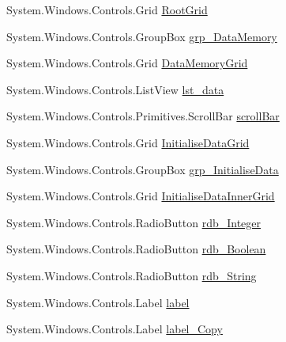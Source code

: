 \begin{DoxyCompactItemize}
\item 
System.\+Windows.\+Controls.\+Grid \hyperlink{class_c_p_u___o_s___simulator_1_1_memory_window_ae2c7b1b6f5c337af62d18b0e2a4d098c}{Root\+Grid}
\item 
System.\+Windows.\+Controls.\+Group\+Box \hyperlink{class_c_p_u___o_s___simulator_1_1_memory_window_a283493c20704b70efe355621cd6e5aa4}{grp\+\_\+\+Data\+Memory}
\item 
System.\+Windows.\+Controls.\+Grid \hyperlink{class_c_p_u___o_s___simulator_1_1_memory_window_a93e699c04992f66b92f0d3b834f267d1}{Data\+Memory\+Grid}
\item 
System.\+Windows.\+Controls.\+List\+View \hyperlink{class_c_p_u___o_s___simulator_1_1_memory_window_a00f6d6a33f4c35800f2e316de335e4dd}{lst\+\_\+data}
\item 
System.\+Windows.\+Controls.\+Primitives.\+Scroll\+Bar \hyperlink{class_c_p_u___o_s___simulator_1_1_memory_window_a2ab8c6459135d66de58829173f0bee5b}{scroll\+Bar}
\item 
System.\+Windows.\+Controls.\+Grid \hyperlink{class_c_p_u___o_s___simulator_1_1_memory_window_aed90d987403a12a322183d032544c507}{Initialise\+Data\+Grid}
\item 
System.\+Windows.\+Controls.\+Group\+Box \hyperlink{class_c_p_u___o_s___simulator_1_1_memory_window_a6cfa52c953fe5704090e7e9f4ac2c9d1}{grp\+\_\+\+Initialise\+Data}
\item 
System.\+Windows.\+Controls.\+Grid \hyperlink{class_c_p_u___o_s___simulator_1_1_memory_window_a2f298db1546fe63bca79b0a810304381}{Initialise\+Data\+Inner\+Grid}
\item 
System.\+Windows.\+Controls.\+Radio\+Button \hyperlink{class_c_p_u___o_s___simulator_1_1_memory_window_ae54a50c88d1e1479fceddd6d3a51a974}{rdb\+\_\+\+Integer}
\item 
System.\+Windows.\+Controls.\+Radio\+Button \hyperlink{class_c_p_u___o_s___simulator_1_1_memory_window_a728a4d572f38d0fe2063005d138d8c32}{rdb\+\_\+\+Boolean}
\item 
System.\+Windows.\+Controls.\+Radio\+Button \hyperlink{class_c_p_u___o_s___simulator_1_1_memory_window_a68b5f36b0514cacaa8e4eeb3415fcd5a}{rdb\+\_\+\+String}
\item 
System.\+Windows.\+Controls.\+Label \hyperlink{class_c_p_u___o_s___simulator_1_1_memory_window_ad5fa08b25fc582e9b2f7c305ed12a960}{label}
\item 
System.\+Windows.\+Controls.\+Label \hyperlink{class_c_p_u___o_s___simulator_1_1_memory_window_a663f25aef0cd9c3755f100b3507b5f84}{label\+\_\+\+Copy}

\end{DoxyCompactItemize}
